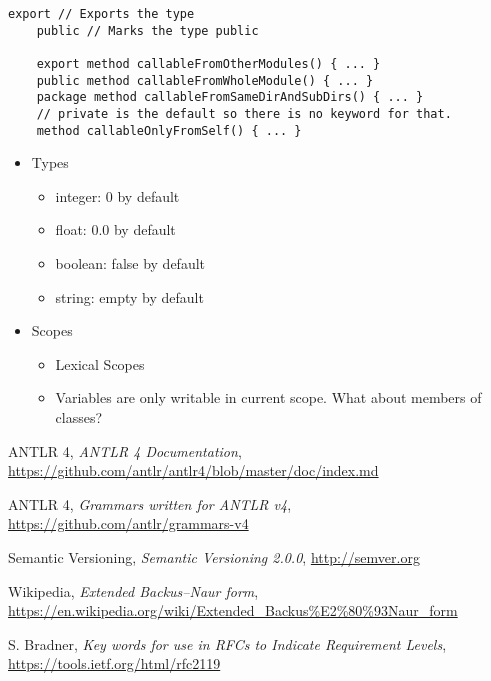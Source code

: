 \documentclass[11pt,a4paper]{report}
\begin{document}
\begin{lstlisting}[language=CayThe]
    export // Exports the type
    public // Marks the type public

    export method callableFromOtherModules() { ... }
    public method callableFromWholeModule() { ... }
    package method callableFromSameDirAndSubDirs() { ... }
    // private is the default so there is no keyword for that.
    method callableOnlyFromSelf() { ... }
\end{lstlisting}


\begin{itemize}
    \item Types
    \begin{itemize}
        \item integer: 0 by default
        \item float: 0.0 by default
        \item boolean: false by default
        \item string: empty by default
    \end{itemize} 
    \item Scopes
    \begin{itemize}
        \item Lexical Scopes
        \item Variables are only writable in current scope. What about members of classes?
    \end{itemize}
\end{itemize}

\clearpage

\begin{thebibliography}{100}

    ANTLR 4,
    \textit{ANTLR 4 Documentation},
    \url{https://github.com/antlr/antlr4/blob/master/doc/index.md}

    ANTLR 4,
    \textit{Grammars written for ANTLR v4},
    \url{https://github.com/antlr/grammars-v4}

    Semantic Versioning,
    \textit{Semantic Versioning 2.0.0},
    \url{http://semver.org}

    Wikipedia,
    \textit{Extended Backus–Naur form},
    \url{https://en.wikipedia.org/wiki/Extended_Backus\%E2\%80\%93Naur_form}

    S. Bradner,
    \textit{Key words for use in RFCs to Indicate Requirement Levels},
    \url{https://tools.ietf.org/html/rfc2119}

\end{thebibliography}
\end{document}
